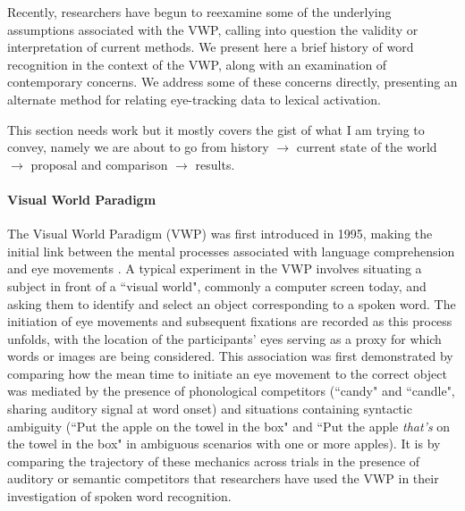 Recently, researchers have begun to reexamine some of the underlying assumptions associated with the VWP, calling into question the validity or interpretation of current methods. We present here a brief history of word recognition in the context of the VWP, along with an examination of contemporary concerns. We address some of these concerns directly, presenting an alternate method for relating eye-tracking data to lexical activation.


This section needs work but it mostly covers the gist of what I am trying to convey, namely we are about to go from history $\rightarrow$ current state of the world $\rightarrow$ proposal and comparison $\rightarrow$ results.




\paragraph{Visual World Paradigm} The Visual World Paradigm (VWP) was first introduced in 1995, making the initial link between the mental processes associated with language comprehension and eye movements \cite{tanenhaus1995integration}. A typical experiment in the VWP involves situating a subject in front of a ``visual world", commonly a computer screen today, and asking them to identify and select an object corresponding to a spoken word. The initiation of eye movements and subsequent fixations are recorded as this process unfolds, with the location of the participants' eyes serving as a proxy for which words or images are being considered. This association was first demonstrated by comparing how the mean time to initiate an eye movement to the correct object was mediated by the presence of phonological competitors (``candy" and ``candle", sharing auditory signal at word onset) and situations containing syntactic ambiguity (``Put the apple on the towel in the box" and ``Put the apple \textit{that's} on the towel in the box" in ambiguous scenarios with one or more apples). It is by comparing the trajectory of these mechanics across trials in the presence of auditory or semantic competitors that researchers have used the VWP in their investigation of spoken word recognition.




